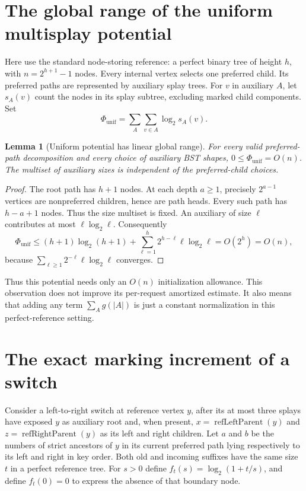 \documentclass[11pt]{article}
\newtheorem{lemma}{Lemma}
\newcommand{\lgx}{\log_2}
\newcommand{\phiu}{\Phi_{\mathrm{unif}}}
\begin{document}
\section{The global range of the uniform multisplay potential}

Here use the standard node-storing reference: a perfect binary tree of
height $h$, with $n=2^{h+1}-1$ nodes. Every internal vertex selects one
preferred child. Its preferred paths are represented by auxiliary splay
trees. For $v$ in auxiliary $A$, let $s_A(v)$ count the nodes in its splay
subtree, excluding marked child components. Set
\[
 \phiu=\sum_A\sum_{v\in A}\lgx s_A(v).
\]

\begin{lemma}[Uniform potential has linear global range]
For every valid preferred-path decomposition and every choice of auxiliary
BST shapes, $0\le\phiu=O(n)$. The multiset of auxiliary sizes is independent
of the preferred-child choices.
\end{lemma}
\begin{proof}
The root path has $h+1$ nodes. At each depth $a\ge1$, precisely
$2^{a-1}$ vertices are nonpreferred children, hence are path heads.
Every such path has $h-a+1$ nodes. Thus the size multiset is fixed.
An auxiliary of size $\ell$ contributes at most $\ell\lgx\ell$.
Consequently
\[
 \phiu\le(h+1)\lgx(h+1)+
       \sum_{\ell=1}^{h}2^{h-\ell}\ell\lgx\ell=O(2^h)=O(n),
\]
because $\sum_{\ell\ge1}2^{-\ell}\ell\lgx\ell$ converges.
\end{proof}

Thus this potential needs only an $O(n)$ initialization allowance.
This observation does not improve its per-request amortized estimate.
It also means that adding any term $\sum_A g(|A|)$ is just a constant
normalization in this perfect-reference setting.

\section{The exact marking increment of a switch}

Consider a left-to-right switch at reference vertex $y$, after its at most
three splays have exposed $y$ as auxiliary root and, when present,
$x=\operatorname{refLeftParent}(y)$ and
$z=\operatorname{refRightParent}(y)$ as its left and right children.
Let $a$ and $b$ be the numbers of strict ancestors of $y$ in its current
preferred path lying respectively to its left and right in key order.
Both old and incoming suffixes have the same size $t$ in a perfect
reference tree. For $s>0$ define $f_t(s)=\lgx(1+t/s)$, and define
$f_t(0)=0$ to express the absence of that boundary node.
\end{document}
